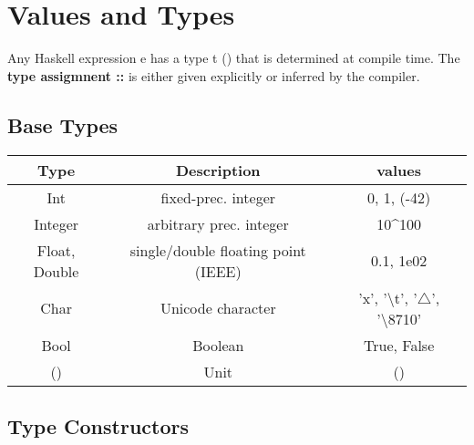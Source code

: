 
\chapter{Values and Types} %
\label{cha:values_and_types}

Any Haskell expression e has a type t () that is determined at compile time.
The \textbf{type assigmnent ::} is either given explicitly or inferred by the compiler.


\section{Base Types}

\vspace{9pt}\begin{center}\begin{tabular}{|c|c|c|}\hline
\rowcolor{grau}     Type            & Description                                   & values                                \\\hline
                    Int             & fixed-prec. integer                           & 0, 1, (-42)                           \\\hline
                    Integer         & arbitrary prec. integer                       & 10\textasciicircum 100                \\\hline
                    Float, Double   & single/double floating point (IEEE)           & 0.1, 1e02                             \\\hline
                    Char            & Unicode character                             & 'x', '\textbackslash t', 
                                                                                        '$\triangle$', '\textbackslash 8710'\\\hline
                    Bool            & Boolean                                       & True, False                           \\\hline
                    ()              & Unit                                          & ()                                    \\\hline
\end{tabular}\end{center}\vspace{9pt}


\section{Type Constructors}

